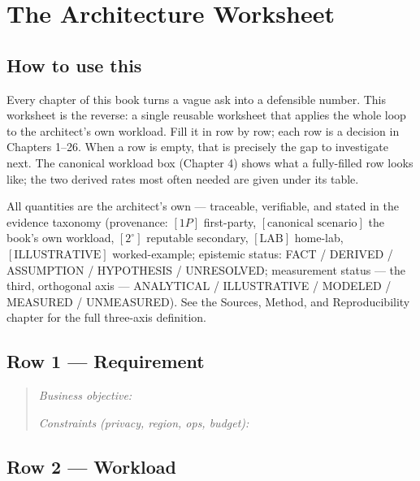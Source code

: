 
\chapter{The Architecture Worksheet}
\label{chap:worksheet}

\section*{How to use this}

Every chapter of this book turns a vague ask into a defensible number. This
worksheet is the reverse: a single reusable worksheet that applies the whole loop to the
architect's own workload. Fill it in row by row; each row is a decision in Chapters
1--26. When a row is empty, that is precisely the gap to investigate next.
The canonical workload box (Chapter 4) shows what a fully-filled row looks
like; the two derived rates most often needed are given under its table.

All quantities are the architect's own --- traceable, verifiable, and stated
in the evidence taxonomy (provenance: $[1P]$ first-party, $[\text{canonical scenario}]$
the book's own workload, $[2^\circ]$ reputable secondary, $[\text{LAB}]$ home-lab,
$[\text{ILLUSTRATIVE}]$ worked-example; epistemic status: FACT / DERIVED /
ASSUMPTION / HYPOTHESIS / UNRESOLVED; measurement status --- the third,
orthogonal axis --- ANALYTICAL / ILLUSTRATIVE / MODELED / MEASURED /
UNMEASURED). See the Sources, Method, and Reproducibility chapter for the
full three-axis definition.

\section*{Row 1 --- Requirement} \label{ws:req}

\begin{quote}
\emph{Business objective:} \hrulefill

\emph{Constraints (privacy, region, ops, budget):} \hrulefill
\end{quote}

\section*{Row 2 --- Workload} \label{ws:workload}

